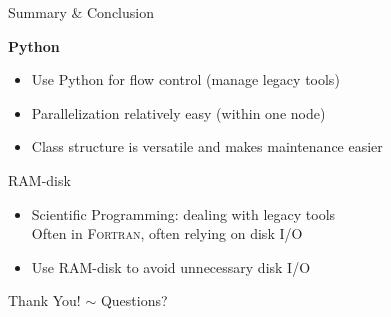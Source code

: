 \documentclass[hyperref={pdfpagelabels=false},compress,final]{beamer}
\begin{document}
\begin{frame}{Summary \& Conclusion}

  {\Large \color{teal} \textbf{Python} }\smallskip
  \begin{itemize}
    \item Use Python for flow control (manage legacy tools) \medskip
    \item Parallelization relatively easy (within one node) \medskip
    \item Class structure is versatile and makes maintenance easier \medskip
  \end{itemize}
  \bigskip
  {\Large \color{purple} {RAM}-disk }\smallskip
  \begin{itemize}
    \item Scientific Programming: dealing with legacy tools\\
          Often in \textsc{Fortran}, often relying on disk I/O \medskip
    \item Use RAM-disk to avoid unnecessary disk I/O \medskip
  \end{itemize}
\end{frame}

\begin{frame}
 \vfill
 \begin{center}
 \LARGE
 Thank You!\hspace{1.5cm}  $\sim$ \hspace{1.5cm} Questions?
 \end{center}
 \vfill
\end{frame}

\end{document}
